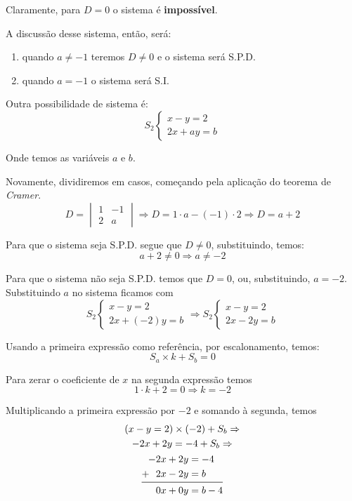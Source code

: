Claramente, para $D=0$ o sistema é \textbf{impossível}.

\medskip

A discussão desse sistema, então, será:

\begin{enumerate}[label={Caso (\Roman*)}, align=Center]
    \item quando $a\neq-1$ teremos $D\neq0$ e o sistema será S.P.D.
    \item quando $a=-1$ o sistema será S.I.
\end{enumerate}

Outra possibilidade de sistema é:
$$
S_2\begin{cases}
x-y=2\\
2x+ay=b
\end{cases}
$$

Onde temos as variáveis $a$ e $b$.

Novamente, dividiremos em casos, começando pela aplicação do teorema de \textit{Cramer}.
$$
D=\begin{vmatrix}
1 & -1\\
2 & a
\end{vmatrix}\Rightarrow D=1\cdot a-(-1)\cdot 2\Rightarrow D=a+2
$$

Para que o sistema seja S.P.D. segue que $D\neq 0$, substituindo, temos:
$$
a+2\neq 0\Rightarrow a\neq -2
$$

Para que o sistema não seja S.P.D. temos que $D=0$, ou, substituindo, $a=-2$.
Substituindo $a$ no sistema ficamos com
$$
S_2 \begin{cases}
x-y=2\\
2x+(-2)y=b
\end{cases} \Rightarrow S_2 \begin{cases}
x-y=2\\
2x-2y=b
\end{cases}
$$

Usando a primeira expressão como referência, por escalonamento, temos:
$$
S_a \times k + S_b=0
$$

Para zerar o coeficiente de $x$ na segunda expressão temos
$$1\cdot k + 2= 0\Rightarrow k=-2$$

Multiplicando a primeira expressão por $-2$ e somando à segunda, temos
\begin{gather*}
    (x-y=2) \times (-2) + S_b \Rightarrow\\
    -2x+2y=-4 + S_b\Rightarrow\\
    \begin{aligned}
    -2x+2y&=-4\\
    \mathbf{+}~~2x-2y&=b\\\midrule
    0x+0y&=b-4
    \end{aligned}
\end{gather*}

